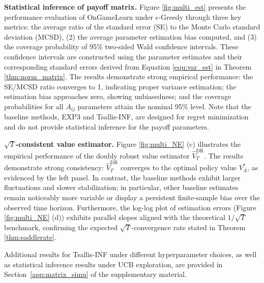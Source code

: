 \documentclass[12pt]{article}
\begin{document}
\noindent\textbf{Statistical inference of payoff matrix.} Figure \ref{fig:multi_est} presents the performance evaluation of OnGameLearn under $\epsilon$-Greedy through three key metrics: the average ratio of the standard error (SE) to the Monte Carlo standard deviation (MCSD), (2) the average parameter estimation bias computed, and (3) the coverage probability of 95\% two-sided Wald confidence intervals. These confidence intervals are constructed using the parameter estimates and their corresponding standard errors derived from Equation \eqref{equ:var_est} in Theorem \ref{thm:norm_matrix}. The results demonstrate strong empirical performance: the SE/MCSD ratio converges to 1, indicating proper variance estimation; the estimation bias approaches zero, showing unbiasedness; and the coverage probabilities for all $A_{ij}$ parameters attain the nominal 95\% level. Note that the baseline methods, EXP3 and Tsallis-INF, are designed for regret minimization and do not provide statistical inference for the payoff parameters.

\noindent\textbf{$\sqrt{T}$-consistent value estimator.} Figure \ref{fig:multi_NE} (c) illustrates the empirical performance of the doubly robust value estimator $\widehat{V}_T^\text{DR}$. The results demonstrate strong consistency: $\widehat{V}_T^\text{DR}$ converges to the optimal policy value $V^\ast_A$, as evidenced by the left panel. In contrast, the baseline methods exhibit larger fluctuations and slower stabilization; in particular, other baseline estimates remain noticeably more variable or display a persistent finite-sample bias over the observed time horizon. 
Furthermore, the log-log plot of estimation errors (Figure \ref{fig:multi_NE} (d)) exhibits parallel slopes aligned with the theoretical $1/\sqrt{T}$ benchmark, confirming the expected $\sqrt{T}$-convergence rate stated in Theorem \ref{thm:saddlerate}. 

Additional results for Tsallis-INF under different hyperparameter choices, as well as statistical inference results under UCB exploration, are provided in Section~\ref{app:matrix_simu} of the supplementary material.
\end{document}
